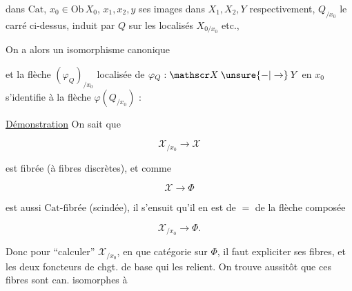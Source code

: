 dans $\mathrm{Cat}$, $x_0\in\mathrm{Ob}\,X_0$, $x_1,x_2,y$ ses images dans $X_1,X_2,Y$ respectivement, $Q_{/x_0}$ le carré  ci-dessus, induit par $Q$ sur les localisés $X_{0/x_0}$ etc.,


On a alors un
isomorphisme canonique


et la flèche $(\varphi_Q)_{/x_0}$ localisée de $\varphi_Q:\mathscr X\mathbin{\unsure{-|\to}}Y$ en  $x_0$ s'identifie à la flèche $\varphi(Q_{/x_0})$ :


\uline{Démonstration}  On sait que

\[
\mathscr X_{/x_0}\longrightarrow\mathscr X
\]

est fibrée  (à fibres discrètes), et comme

\[
\mathscr X\longrightarrow\Phi
\]

est aussi $\mathrm{Cat}$-fibrée (scindée), il s'ensuit qu'il en est de $=$ de la flèche composée

\[
\mathscr X_{/x_0}\longrightarrow\Phi .
\]

Donc  \unsure{,} pour ``calculer'' $\mathscr X_{/x_0}$, en  que catégorie sur $\Phi$, il faut expliciter ses  fibres, et les deux foncteurs de chgt. de base qui les relient. On trouve aussitôt que ces fibres sont can. isomorphes à

